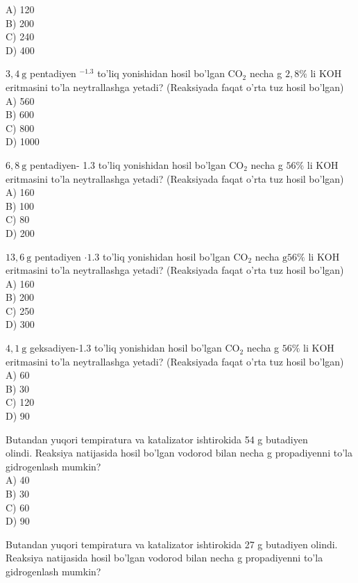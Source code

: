 A) 120\\
B) 200\\
C) 240\\
D) 400
  \item $3,4 \mathrm{~g}$ pentadiyen ${ }^{-1.3}$ to'liq yonishidan hosil bo'lgan $\mathrm{CO}_{2}$ necha g $2,8 \%$ li KOH eritmasini to'la neytrallashga yetadi? (Reaksiyada faqat o'rta tuz hosil bo'lgan)\\
A) 560\\
B) 600\\
C) 800\\
D) 1000
  \item $6,8 \mathrm{~g}$ pentadiyen- 1.3 to'liq yonishidan hosil bo'lgan $\mathrm{CO}_{2}$ necha g $56 \%$ li KOH eritmasini to'la neytrallashga yetadi? (Reaksiyada faqat o'rta tuz hosil bo'lgan)\\
A) 160\\
B) 100\\
C) 80\\
D) 200
  \item $13,6 \mathrm{~g}$ pentadiyen $\cdot 1.3$ to'liq yonishidan hosil bo'lgan $\mathrm{CO}_{2}$ necha $\mathrm{g} 56 \%$ li KOH eritmasini to'la neytrallashga yetadi? (Reaksiyada faqat o'rta tuz hosil bo'lgan)\\
A) 160\\
B) 200\\
C) 250\\
D) 300
  \item $4,1 \mathrm{~g}$ geksadiyen-1.3 to'liq yonishidan hosil bo'lgan $\mathrm{CO}_{2}$ necha g $56 \%$ li KOH eritmasini to'la neytrallashga yetadi? (Reaksiyada faqat o'rta tuz hosil bo'lgan)\\
A) 60\\
B) 30\\
C) 120\\
D) 90
  \item Butandan yuqori tempiratura va katalizator ishtirokida 54 g butadiyen\\
olindi. Reaksiya natijasida hosil bo'lgan vodorod bilan necha g propadiyenni to'la gidrogenlash mumkin?\\
A) 40\\
B) 30\\
C) 60\\
D) 90
  \item Butandan yuqori tempiratura va katalizator ishtirokida 27 g butadiyen olindi. Reaksiya natijasida hosil bo'lgan vodorod bilan necha g propadiyenni to'la gidrogenlash mumkin?\\
